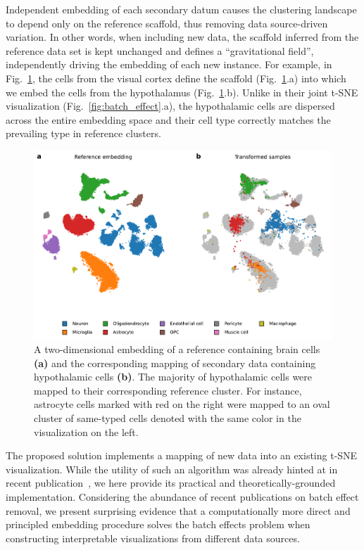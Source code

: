 \documentclass[runningheads]{llncs}
\begin{document}
Independent embedding of each secondary datum causes the clustering landscape
to depend only on the reference scaffold, thus removing data source-driven
variation. In other words, when including new data, the scaffold inferred from
the reference data set is kept unchanged and defines a ``gravitational field'',
independently driving the embedding of each new instance. For example, in
Fig.~\ref{fig:transform_brain}, the cells from the visual cortex define the
scaffold (Fig.~\ref{fig:transform_brain}.a) into which we embed the cells from
the hypothalamus (Fig.~\ref{fig:transform_brain}.b). Unlike in their joint
t\nobreakdash -SNE visualization (Fig.~\ref{fig:batch_effect}.a), the
hypothalamic cells are dispersed across the entire embedding space and their
cell type correctly matches the prevailing type in reference clusters.

\begin{figure}[htb]
  \includegraphics[width=\textwidth]{transform_brain.pdf}
  \caption{A two-dimensional embedding of a reference containing brain cells
  \textbf{(a)} and the corresponding mapping of secondary data containing hypothalamic
  cells \textbf{(b)}.  The majority of hypothalamic cells were mapped to their
  corresponding reference cluster. For instance, astrocyte cells marked with
  red on the right were mapped to an oval cluster of same-typed cells denoted
  with the same color in the visualization on the left.}
  \label{fig:transform_brain}
\end{figure}

The proposed solution implements a mapping of new data into an existing
t-SNE visualization. While the utility of such an algorithm was already hinted
at in recent publication~\cite{Kobak2019}, we here provide its
practical and theoretically-grounded implementation. Considering the abundance
of recent publications on batch effect removal, we present surprising evidence
that a computationally more direct and principled embedding procedure solves
the batch effects problem when constructing interpretable visualizations from
different data sources.
\end{document}
